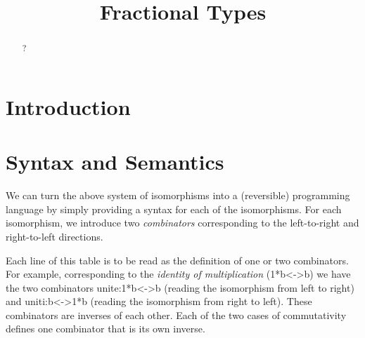 \documentclass{llncs}
\begin{document}
\title{Fractional Types}
\author{}
\institute{}
\maketitle

\begin{abstract}
?
\end{abstract}

\section{Introduction} 

\section{Syntax and Semantics}

We can turn the above system of isomorphisms into a (reversible)
programming language by simply providing a syntax for each of the
isomorphisms. For each isomorphism, we introduce two
\emph{combinators} corresponding to the left-to-right and
right-to-left directions. 

\begin{definition}
\label{def:primitives-langRev}

  
\end{definition}

Each line of this table is to be read as the definition of one or two
combinators. For example, corresponding to the \textit{identity of
  multiplication} ({{1*b<->b}}) we have the two combinators
{{unite:1*b<->b}} (reading the isomorphism from left to right) and
{{uniti:b<->1*b}} (reading the isomorphism from right to left). These
combinators are inverses of each other.  Each of the two cases of
commutativity defines one combinator that is its own inverse.
\end{document}
